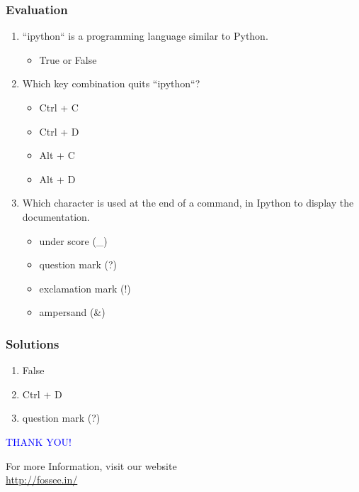 \documentclass[presentation]{beamer}
\begin{document}
\begin{frame}
\frametitle{Evaluation}
\label{sec-9}



\begin{enumerate}
\item ``ipython`` is a programming language similar to Python.
\begin{itemize}
\item True or False
\end{itemize}
\item Which key combination quits ``ipython``?
\begin{itemize}
\item Ctrl + C
\item Ctrl + D
\item Alt + C
\item Alt + D
\end{itemize}
\item Which character is used at the end of a command, in Ipython to
     display the documentation.
\begin{itemize}
\item under score (\_)
\item question mark (?)
\item exclamation mark (!)
\item ampersand (\&)
\end{itemize}
\end{enumerate}
\end{frame}
\begin{frame}
\frametitle{Solutions}
\label{sec-10}

   

\begin{enumerate}
\item False
\item Ctrl + D
\item question mark (?)
\end{enumerate}
\end{frame}
\begin{frame}

  \begin{block}{}
  \begin{center}
  \textcolor{blue}{\Large THANK YOU!} 
  \end{center}
  \end{block}
\begin{block}{}
  \begin{center}
    For more Information, visit our website\\
    \url{http://fossee.in/}
  \end{center}  
  \end{block}
\end{frame}
\end{document}
